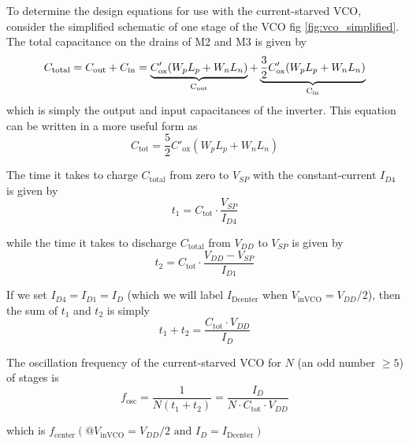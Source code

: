 To determine the design equations for use with the current-starved VCO, consider
the simplified schematic of one stage of the VCO fig \ref{fig:vco_simplified}. The total
capacitance on the drains of M2 and M3 is given by
\begin{equation}
	C_{\text{total}} = C_{\text{out}} + C_{\text{in}} = 
\underbrace{C'_{\text{ox}}(W_p L_p + W_n L_n)}_{\text{C\textsubscript{out}}} + 
\underbrace{\frac{3}{2} C'_{\text{ox}}(W_p L_p + W_n L_n)}_{\text{C\textsubscript{in}}}
\end{equation}
which is simply the output and input capacitances of the inverter. This equation can be written in a more useful form as
\begin{equation}
C_{\text{tot}} = \frac{5}{2} C'_{\text{ox}} (W_p L_p + W_n L_n)
\tag{19.19}
\end{equation}

\noindent The time it takes to charge $C_{\text{total}}$ from zero to $V_{SP}$ with the constant-current $I_{D4}$ is given by
\begin{equation}
t_1 = C_{\text{tot}} \cdot \frac{V_{SP}}{I_{D4}}
\tag{19.20}
\end{equation}

\noindent while the time it takes to discharge $C_{\text{total}}$ from $V_{DD}$ to $V_{SP}$ is given by
\begin{equation}
t_2 = C_{\text{tot}} \cdot \frac{V_{DD} - V_{SP}}{I_{D1}}
\tag{19.21}
\end{equation}

If we set $I_{D4} = I_{D1} = I_D$ (which we will label $I_{\text{Dcenter}}$ when $V_{\text{inVCO}} = V_{DD}/2$), then the sum of $t_1$ and $t_2$ is simply
\begin{equation}
t_1 + t_2 = \frac{C_{\text{tot}} \cdot V_{DD}}{I_D}
\tag{19.22}
\end{equation}

The oscillation frequency of the current-starved VCO for $N$ (an odd number $\geq 5$) of stages is
\begin{equation}
f_{\text{osc}} = \frac{1}{N(t_1 + t_2)} = \frac{I_D}{N \cdot C_{\text{tot}} \cdot V_{DD}}
\tag{19.23}
\end{equation}

which is $f_{\text{center}}(@ V_{\text{inVCO}} = V_{DD}/2 \text{ and } I_D = I_{\text{Dcenter}})$


